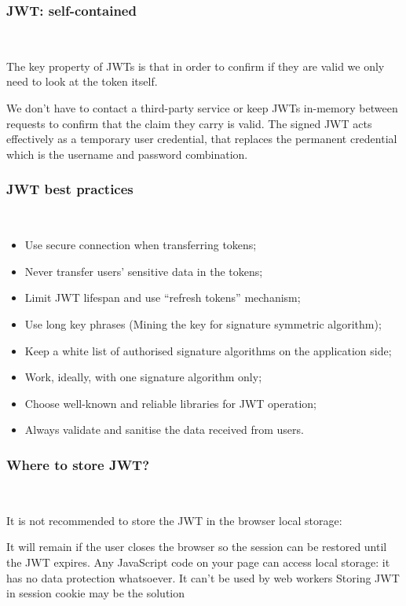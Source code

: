 \documentclass{beamer}
\begin{document}
\begin{frame}
	\frametitle{JWT: self-contained}\ \newline

The key property of JWTs is that in order to confirm if they are valid we only need to look at the token itself.

We don't have to contact a third-party service or keep JWTs in-memory between requests to confirm that the claim they carry is valid.
The signed JWT acts effectively as a temporary user credential, that replaces the permanent credential which is the username and password combination.
\end{frame}

\begin{frame}
	\frametitle{JWT best practices}\ \newline
	
	\begin{itemize}	
		\item Use secure connection when transferring tokens;
		\item Never transfer users’ sensitive data in the tokens;
		\item Limit JWT lifespan and use “refresh tokens” mechanism;
		\item Use long key phrases (Mining the key for signature symmetric algorithm);
		\item Keep a white list of authorised signature algorithms on the application side;
		\item Work, ideally, with one signature algorithm only;
		\item Choose well-known and reliable libraries for JWT operation;
		\item Always validate and sanitise the data received from users.
	\end{itemize}	

\end{frame}

\begin{frame}
	\frametitle{Where to store JWT?}\ \newline
	
	It is not recommended to store the JWT in the browser local storage:

It will remain if the user closes the browser so the session can be restored until the JWT expires.
Any JavaScript code on your page can access local storage: it has no data protection whatsoever.
It can’t be used by web workers
Storing JWT in session cookie may be the solution
\end{frame}
\end{document}
